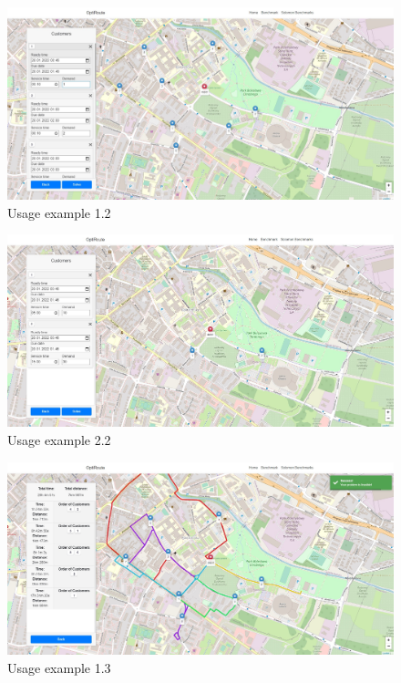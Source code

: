 \documentclass[a4paper,twoside,12pt]{book}
\begin{document}
\begin{figure}[H]
\centering
\includegraphics[width=\textwidth]{images/customersScenario1.jpg}
\caption{Usage example 1.2}
\label{fig:customersScenario1}
\end{figure}

\begin{figure}[H]
\centering
\includegraphics[width=\textwidth]{images/customersScenario2.jpg}
\caption{Usage example 2.2}
\label{fig:customersScenario2}
\end{figure}

\begin{figure}[H]
\centering
\includegraphics[width=\textwidth]{images/solutionSuccess.jpg}
\caption{Usage example 1.3}
\label{fig:solutionSuccess}
\end{figure}
\end{document}
